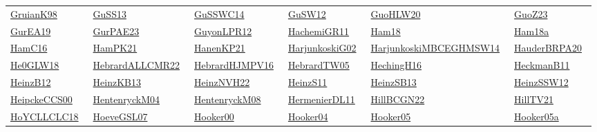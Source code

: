 \begin{longtable}{*{6}{l}}
\href{works/GruianK98.pdf}{GruianK98}~\cite{GruianK98} & \href{works/GuSS13.pdf}{GuSS13}~\cite{GuSS13} & \href{}{GuSSWC14}~\cite{GuSSWC14} & \href{works/GuSW12.pdf}{GuSW12}~\cite{GuSW12} & \href{}{GuoHLW20}~\cite{GuoHLW20} & \href{}{GuoZ23}~\cite{GuoZ23}\\ 
\href{works/GurEA19.pdf}{GurEA19}~\cite{GurEA19} & \href{works/GurPAE23.pdf}{GurPAE23}~\cite{GurPAE23} & \href{works/GuyonLPR12.pdf}{GuyonLPR12}~\cite{GuyonLPR12} & \href{works/HachemiGR11.pdf}{HachemiGR11}~\cite{HachemiGR11} & \href{works/Ham18.pdf}{Ham18}~\cite{Ham18} & \href{}{Ham18a}~\cite{Ham18a}\\ 
\href{works/HamC16.pdf}{HamC16}~\cite{HamC16} & \href{works/HamPK21.pdf}{HamPK21}~\cite{HamPK21} & \href{works/HanenKP21.pdf}{HanenKP21}~\cite{HanenKP21} & \href{works/HarjunkoskiG02.pdf}{HarjunkoskiG02}~\cite{HarjunkoskiG02} & \href{}{HarjunkoskiMBCEGHMSW14}~\cite{HarjunkoskiMBCEGHMSW14} & \href{}{HauderBRPA20}~\cite{HauderBRPA20}\\ 
\href{works/He0GLW18.pdf}{He0GLW18}~\cite{He0GLW18} & \href{works/HebrardALLCMR22.pdf}{HebrardALLCMR22}~\cite{HebrardALLCMR22} & \href{works/HebrardHJMPV16.pdf}{HebrardHJMPV16}~\cite{HebrardHJMPV16} & \href{works/HebrardTW05.pdf}{HebrardTW05}~\cite{HebrardTW05} & \href{works/HechingH16.pdf}{HechingH16}~\cite{HechingH16} & \href{works/HeckmanB11.pdf}{HeckmanB11}~\cite{HeckmanB11}\\ 
\href{works/HeinzB12.pdf}{HeinzB12}~\cite{HeinzB12} & \href{works/HeinzKB13.pdf}{HeinzKB13}~\cite{HeinzKB13} & \href{works/HeinzNVH22.pdf}{HeinzNVH22}~\cite{HeinzNVH22} & \href{works/HeinzS11.pdf}{HeinzS11}~\cite{HeinzS11} & \href{works/HeinzSB13.pdf}{HeinzSB13}~\cite{HeinzSB13} & \href{works/HeinzSSW12.pdf}{HeinzSSW12}~\cite{HeinzSSW12}\\ 
\href{works/HeipckeCCS00.pdf}{HeipckeCCS00}~\cite{HeipckeCCS00} & \href{works/HentenryckM04.pdf}{HentenryckM04}~\cite{HentenryckM04} & \href{works/HentenryckM08.pdf}{HentenryckM08}~\cite{HentenryckM08} & \href{works/HermenierDL11.pdf}{HermenierDL11}~\cite{HermenierDL11} & \href{}{HillBCGN22}~\cite{HillBCGN22} & \href{works/HillTV21.pdf}{HillTV21}~\cite{HillTV21}\\ 
\href{works/HoYCLLCLC18.pdf}{HoYCLLCLC18}~\cite{HoYCLLCLC18} & \href{works/HoeveGSL07.pdf}{HoeveGSL07}~\cite{HoeveGSL07} & \href{}{Hooker00}~\cite{Hooker00} & \href{works/Hooker04.pdf}{Hooker04}~\cite{Hooker04} & \href{works/Hooker05.pdf}{Hooker05}~\cite{Hooker05} & \href{works/Hooker05a.pdf}{Hooker05a}~\cite{Hooker05a}\\ 

\end{longtable}
